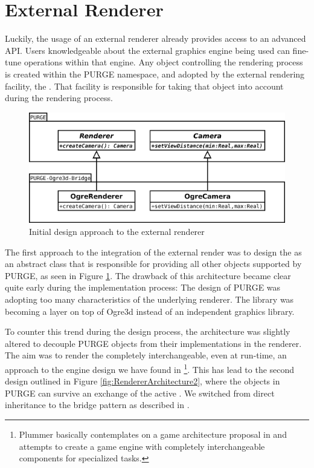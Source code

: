 \section{External Renderer}
\label{chapter:design:renderer}

	Luckily, the usage of an external renderer already provides access to an advanced API. Users knowledgeable about the external graphics engine being used can fine-tune operations within that engine. Any object controlling the rendering process is created within the PURGE namespace, and adopted by the external rendering facility, the . That facility is responsible for taking that object into account during the rendering process.

	\begin{figure}[htbp]
		\centering
		\includegraphics[width=14cm]{images/RendererArchitecture1.png}
		\caption{Initial design approach to the external renderer}
		\label{fig:RendererArchitecture1}
	\end{figure}

	The first approach to the integration of the external render was to design the  as an abstract class that is responsible for providing all other objects supported by PURGE, as seen in Figure \ref{fig:RendererArchitecture1}. The drawback of this architecture became clear quite early during the implementation process: The design of PURGE was adopting too many characteristics of the underlying renderer. The library was becoming a layer on top of Ogre3d instead of an independent graphics library.

	To counter this trend during the design process, the architecture was slightly altered to decouple PURGE objects from their implementations in the renderer. The aim was to render the  completely interchangeable, even at run-time, an approach to the engine design we have found in \cite{Plummer2004}\footnote{Plummer basically contemplates on a game architecture proposal in \cite{Rollings:2003:GAD:1209229} and attempts to create a game engine with completely interchangeable components for specialized tasks.}. This has lead to the second design outlined in Figure \ref{fig:RendererArchitecture2}, where the objects in PURGE can survive an exchange of the active . We switched from direct inheritance to the bridge pattern as described in \cite{GOF}.

